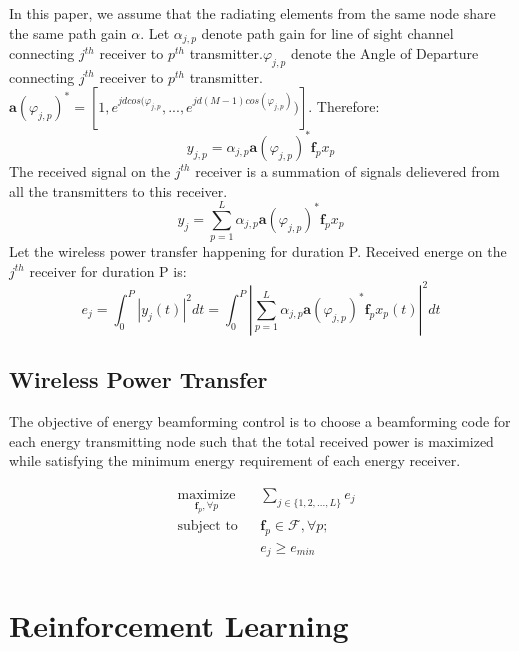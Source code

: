 In this paper, we assume that the radiating elements from the same node share the same path gain $\alpha$. Let $\alpha_{j,p}$ denote path gain for line of sight channel connecting $j^{th}$ receiver to $p^{th}$ transmitter.$\varphi_{j,p}$ denote the Angle of Departure connecting $j^{th}$ receiver to $p^{th}$ transmitter. $\textbf{a}(\varphi_{j,p})^*=[1,e^{jdcos(\varphi_{j,p}},...,e^{jd(M-1)cos(\varphi_{j,p})})]$. Therefore:
\begin{equation}
y_{j,p}=\alpha_{j,p} \textbf{a}(\varphi_{j,p})^* \textbf{f}_p x_p
\end{equation}
The received signal on the $j^{th}$ receiver is a summation of signals delievered from all the transmitters to this receiver.
\begin{equation}
y_j=\sum_{p=1}^L \alpha_{j,p} \textbf{a}(\varphi_{j,p})^* \textbf{f}_p x_p
\end{equation}
Let the wireless power transfer happening for duration P. Received energe on the $j^{th}$ receiver for duration P is:
\begin{equation}
e_j=\int_0^P |y_j(t)|^2 dt=\int_0^P |\sum_{p=1}^L \alpha_{j,p} \textbf{a}(\varphi_{j,p})^* \textbf{f}_p x_p(t)|^2 dt
\end{equation}

\subsection{Wireless Power Transfer}

The objective of energy beamforming control is to choose a beamforming code for each energy transmitting node such that the total received power is maximized while satisfying the minimum energy requirement of each energy receiver.

\begin{equation*}
    \begin{aligned}
        & \underset{ \textbf{f}_p, \forall p}{\text{maximize}}
        && \displaystyle\sum_{j \in \{1,2,...,L\}} e_j\\
        & \text{subject to}
        && \textbf{f}_p \in \mathcal{F}, \forall p;\\
        &&& e_j \geq e_{min}\\
    \end{aligned}
\end{equation*}


\section{Reinforcement Learning}


